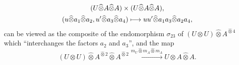 \[
\begin{gathered}
(U\widehat\otimes A\widehat\otimes A)\times(U\widehat\otimes A\widehat\otimes A),\\
(u\widehat\otimes a_1\widehat\otimes a_2,u'\widehat\otimes a_3\widehat\otimes a_4)
\longmapsto uu'\widehat\otimes a_1a_3\widehat\otimes a_2a_4,
\end{gathered}
\]
can be viewed as the composite of the endomorphism $\sigma_{23}$ of $(U\otimes U)\widehat\otimes A^{\widehat\otimes4}$ which ``interchanges the factors $a_2$ and $a_3$'', and the map
\[
(U\otimes U)\widehat\otimes A^{\widehat\otimes2}\widehat\otimes A^{\widehat\otimes2}
\xrightarrow{m_U\widehat\otimes m_A\widehat\otimes m_A}U\widehat\otimes A\widehat\otimes A.
\]
